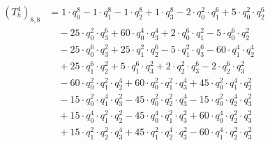 \begin{align*}(T_{h}^4)_{8,8}&=1\cdot q_0^{8}-1\cdot q_1^{8}-1\cdot q_2^{8}+1\cdot q_3^{8}-2\cdot q_0^{2}\cdot q_1^{6}+5\cdot q_0^{2}\cdot q_2^{6}\\
&\quad -25\cdot q_0^{2}\cdot q_3^{6}+60\cdot q_0^{4}\cdot q_3^{4}+2\cdot q_0^{6}\cdot q_1^{2}-5\cdot q_0^{6}\cdot q_2^{2}\\
&\quad -25\cdot q_0^{6}\cdot q_3^{2}+25\cdot q_1^{2}\cdot q_2^{6}-5\cdot q_1^{2}\cdot q_3^{6}-60\cdot q_1^{4}\cdot q_2^{4}\\
&\quad +25\cdot q_1^{6}\cdot q_2^{2}+5\cdot q_1^{6}\cdot q_3^{2}+2\cdot q_2^{2}\cdot q_3^{6}-2\cdot q_2^{6}\cdot q_3^{2}\\
&\quad -60\cdot q_0^{2}\cdot q_1^{2}\cdot q_2^{4}+60\cdot q_0^{2}\cdot q_1^{2}\cdot q_3^{4}+45\cdot q_0^{2}\cdot q_1^{4}\cdot q_2^{2}\\
&\quad -15\cdot q_0^{2}\cdot q_1^{4}\cdot q_3^{2}-45\cdot q_0^{2}\cdot q_2^{2}\cdot q_3^{4}-15\cdot q_0^{2}\cdot q_2^{4}\cdot q_3^{2}\\
&\quad +15\cdot q_0^{4}\cdot q_1^{2}\cdot q_2^{2}-45\cdot q_0^{4}\cdot q_1^{2}\cdot q_3^{2}+60\cdot q_0^{4}\cdot q_2^{2}\cdot q_3^{2}\\
&\quad +15\cdot q_1^{2}\cdot q_2^{2}\cdot q_3^{4}+45\cdot q_1^{2}\cdot q_2^{4}\cdot q_3^{2}-60\cdot q_1^{4}\cdot q_2^{2}\cdot q_3^{2}\end{align*}
